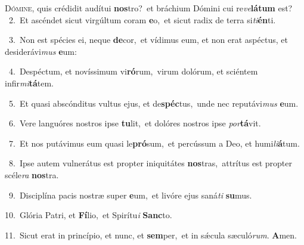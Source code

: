 \lettrine{\initial\textcolor{\initialcolor}{D}}{ómine,} quis crédidit audítui \textbf{nos}\-tro?~\star et bráchium Dómini cui re\-\textit{ve}\-\textbf{lá}\textbf{tum} est?\\
{\numbfont\textcolor{\numbcolor}{~2.}}~Et ascéndet sicut virgúltum coram \textbf{e}\-o,~\star et sicut radix de terra si\-\textit{ti}\-\textbf{én}ti.\par
{\numbfont\textcolor{\numbcolor}{~3.}}~Non est spécies ei, neque \textbf{de}\-cor,~\star et vídimus eum, et non erat aspéctus, et desiderávi\textit{mus} \textbf{e}\-um:\par
{\numbfont\textcolor{\numbcolor}{~4.}}~Despéctum, et novíssimum vi\-\textbf{ró}\-rum,~\star virum dolórum, et sciéntem infir\-\textit{mi}\-\textbf{tá}tem.\par
{\numbfont\textcolor{\numbcolor}{~5.}}~Et quasi abscónditus vultus ejus, et de\-\textbf{spéc}\-tus,~\star unde nec reputávi\textit{mus} \textbf{e}\-um.\par
{\numbfont\textcolor{\numbcolor}{~6.}}~Vere languóres nostros ipse \textbf{tu}\-lit,~\star et dolóres nostros ipse \textit{por}\-\textbf{tá}vit.\par
{\numbfont\textcolor{\numbcolor}{~7.}}~Et nos putávimus eum quasi le\-\textbf{pró}\-sum,~\star et percússum a Deo, et humi\-\textit{li}\-\textbf{á}tum.\par
{\numbfont\textcolor{\numbcolor}{~8.}}~Ipse autem vulnerátus est propter iniquitátes \textbf{nos}\-tras,~\star attrítus est propter scéle\textit{ra} \textbf{nos}\-tra.\par
{\numbfont\textcolor{\numbcolor}{~9.}}~Disciplína pacis nostræ super \textbf{e}\-um,~\star et livóre ejus saná\textit{ti} \textbf{su}\-mus.\par
{\numbfont\textcolor{\numbcolor}{10.}}~Glória Patri, et \textbf{Fí}\-lio,~\star et Spirítu\textit{i} \textbf{Sanc}\-to.\par
{\numbfont\textcolor{\numbcolor}{11.}}~Sicut erat in princípio, et nunc, et \textbf{sem}\-per,~\star et in sǽcula sæculó\-\textit{rum}\-. \textbf{A}\-men.\par
